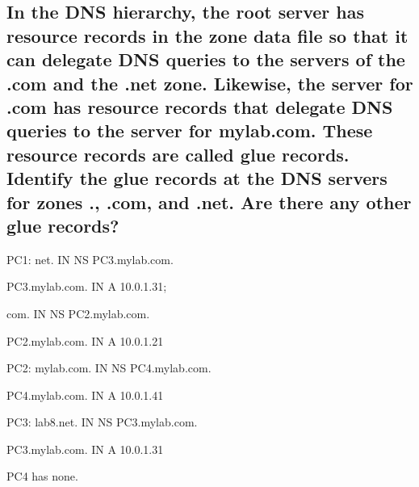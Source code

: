 \documentclass[a4paper, 11pt]{article}
\begin{document}
\subsection{In the DNS hierarchy, the root server has resource records in the zone data file so that it can delegate DNS queries to the servers of the .com and the .net zone. Likewise, the server for .com has resource records that delegate DNS queries to the server for mylab.com. These resource records are called glue records. Identify the glue records at the DNS servers for zones ., .com, and .net. Are there any other glue records? }

PC1: net.                IN  NS    PC3.mylab.com. 

PC3.mylab.com.          IN  A     10.0.1.31;

com.                    IN  NS    PC2.mylab.com.

PC2.mylab.com.          IN  A     10.0.1.21

PC2: mylab.com.          IN  NS    PC4.mylab.com.

PC4.mylab.com.          IN  A     10.0.1.41

PC3: lab8.net.           IN  NS    PC3.mylab.com.

PC3.mylab.com.          IN  A     10.0.1.31

PC4 has none.
\end{document}
